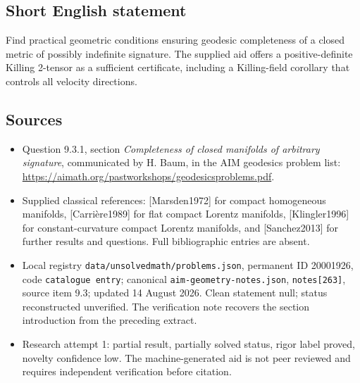 \documentclass[11pt]{article}
\begin{document}
\subsection{Short English statement}
Find practical geometric conditions ensuring geodesic completeness of a closed metric of possibly indefinite signature. The supplied aid offers a positive-definite Killing 2-tensor as a sufficient certificate, including a Killing-field corollary that controls all velocity directions.
\subsection{Sources}
\begin{itemize}
\item Question 9.3.1, section \emph{Completeness of closed manifolds of arbitrary signature}, communicated by H. Baum, in the AIM geodesics problem list: \url{https://aimath.org/pastworkshops/geodesicsproblems.pdf}.
\item Supplied classical references: [Marsden1972] for compact homogeneous manifolds, [Carri\`ere1989] for flat compact Lorentz manifolds, [Klingler1996] for constant-curvature compact Lorentz manifolds, and [Sanchez2013] for further results and questions. Full bibliographic entries are absent.
\item Local registry \texttt{data/unsolvedmath/problems.json}, permanent ID 20001926, code \texttt{catalogue entry}; canonical \texttt{aim-geometry-notes.json}, \texttt{notes[263]}, source item 9.3; updated 14 August 2026. Clean statement null; status reconstructed unverified. The verification note recovers the section introduction from the preceding extract.
\item Research attempt 1: partial result, partially solved status, rigor label proved, novelty confidence low. The machine-generated aid is not peer reviewed and requires independent verification before citation.
\end{itemize}
\end{document}
